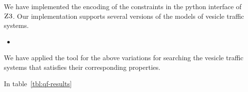 We have implemented the encoding of the constraints
in the python interface of $\textsc{Z3}$.
%
Our implementation supports several versions of the
models of vesicle traffic systems.
\begin{itemize}
\item 
\end{itemize}

We have applied the tool for the above variations
for searching the vesicle traffic systems that satisfies
their corresponding properties.
%

In table~\ref{tbl:qf-results} 



